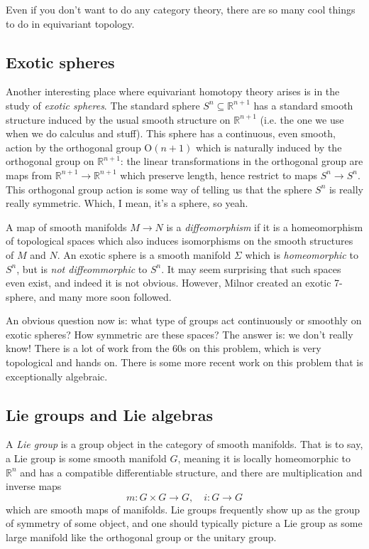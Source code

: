 \documentclass[10pt]{amsart}
\theoremstyle{definition}
\newcommand{\cdef}[1]{\textcolor{Bittersweet}{#1}}
\begin{document}
Even if you don't want to do any category theory, there are so many cool things to do in equivariant topology.

\subsection*{Exotic spheres}
Another interesting place where equivariant homotopy theory arises is in the study of \cdef{\emph{exotic spheres}}. The standard sphere $S^n \subseteq \mathbb{R}^{n+1}$ has a standard smooth structure induced by the usual smooth structure on $\mathbb{R}^{n+1}$ (i.e. the one we use when we do calculus and stuff). This sphere has a continuous, even smooth, action by the orthogonal group $\mathrm{O}(n+1)$ which is naturally induced by the orthogonal group on $\mathbb{R}^{n+1}$: the linear transformations in the orthogonal group are maps from $\mathbb{R}^{n+1} \to \mathbb{R}^{n+1}$ which preserve length, hence restrict to maps $S^n \to S^n$. This orthogonal group action is some way of telling us that the sphere $S^n$ is really really symmetric. Which, I mean, it's a sphere, so yeah.

A map of smooth manifolds $M \to N$ is a \emph{diffeomorphism} if it is a homeomorphism of topological spaces which also induces isomorphisms on the smooth structures of $M$ and $N$. An exotic sphere is a smooth manifold $\Sigma$ which is \emph{homeomorphic} to $S^n$, but is \emph{not diffeommorphic} to $S^n$. It may seem surprising that such spaces even exist, and indeed it is not obvious. However, Milnor created an exotic 7-sphere, and many more soon followed. 

An obvious question now is: what type of groups act continuously or smoothly on exotic spheres? How symmetric are these spaces? The answer is: we don't really know! There is a lot of work from the 60s on this problem, which is very topological and hands on. There is some more recent work on this problem that is exceptionally algebraic. 


\subsection*{Lie groups and Lie algebras}
A \cdef{\emph{Lie group}} is a group object in the category of smooth manifolds. That is to say, a Lie group is some smooth manifold $G$, meaning it is locally homeomorphic to $\mathbb{R}^n$ and has a compatible differentiable structure, and there are multiplication and inverse maps
\[
m:G \times G \to G, \quad i:G \to G
\]
which are smooth maps of manifolds. Lie groups frequently show up  as the group of symmetry of some object, and one should typically picture a Lie group as some large manifold like the orthogonal group or the unitary group. 
\end{document}
